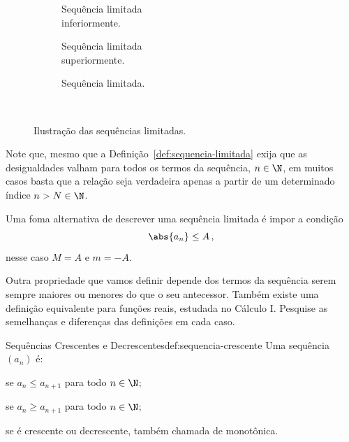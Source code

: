 \begin{figure}
  \centering
  \begin{subfigure}[t]{0.3333\linewidth}
    \centering
    
    \caption{Sequência limitada\\inferiormente.}
    \label{fig:sequencia_limitada_1}
  \end{subfigure}%
  \begin{subfigure}[t]{0.3333\linewidth}
    \centering
    
    \caption{Sequência limitada\\superiormente.}
    \label{fig:sequencia_limitada_2}
  \end{subfigure}%
  \begin{subfigure}[t]{0.3333\linewidth}
    \centering
    
    \caption{Sequência limitada.}
    \label{fig:sequencia_limitada_3}
  \end{subfigure}\\
  \caption{Ilustração das sequências limitadas.}
  \label{fig:sequencia_limitada}
\end{figure}

Note que, mesmo que a Definição~\ref{def:sequencia-limitada} exija que
as desigualdades valham para todos os termos da sequência, $n\in\N$,
em muitos casos basta que a relação seja verdadeira apenas a partir de um
determinado índice $n>N\in\N$.

Uma foma alternativa de descrever uma sequência limitada é impor a condição
\[
  \abs{a_n} \leq A  \,,
\]
nesse caso $M=A$ e $m=-A$.

Outra propriedade que vamos definir depende dos termos da sequência serem sempre
maiores ou menores do que o seu antecessor. Também existe uma definição equivalente
para funções reais, estudada no Cálculo I. Pesquise as semelhanças e diferenças
das definições em cada caso.

\begin{definicao}{Sequências Crescentes e Decrescentes}{def:sequencia-crescente}
  Uma sequência $(a_n)$ é:%
  \begin{description}[labelwidth=\widthof{\bfseries Decrescente}]
      \item[Crescente]   se $a_n \leq a_{n+1}$ para todo $n\in\N$;
      \item[Decrescente] se $a_n \geq a_{n+1}$ para todo $n\in\N$;
      \item[Monótona]    se é crescente ou decrescente, também chamada de monotônica.
  \end{description}
\end{definicao}

